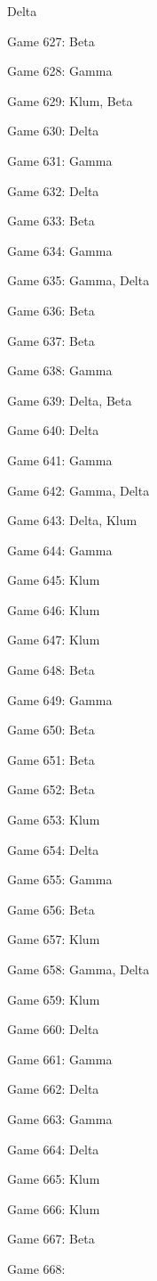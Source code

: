 \documentclass{article}
\begin{document}
\begin{multicols}{3}
\begin{compactitem}
Delta
\item Game 627:
Beta
\item Game 628:
Gamma
\item Game 629:
Klum, Beta
\item Game 630:
Delta
\item Game 631:
Gamma
\item Game 632:
Delta
\item Game 633:
Beta
\item Game 634:
Gamma
\item Game 635:
Gamma, Delta
\item Game 636:
Beta
\item Game 637:
Beta
\item Game 638:
Gamma
\item Game 639:
Delta, Beta
\item Game 640:
Delta
\item Game 641:
Gamma
\item Game 642:
Gamma, Delta
\item Game 643:
Delta, Klum
\item Game 644:
Gamma
\item Game 645:
Klum
\item Game 646:
Klum
\item Game 647:
Klum
\item Game 648:
Beta
\item Game 649:
Gamma
\item Game 650:
Beta
\item Game 651:
Beta
\item Game 652:
Beta
\item Game 653:
Klum
\item Game 654:
Delta
\item Game 655:
Gamma
\item Game 656:
Beta
\item Game 657:
Klum
\item Game 658:
Gamma, Delta
\item Game 659:
Klum
\item Game 660:
Delta
\item Game 661:
Gamma
\item Game 662:
Delta
\item Game 663:
Gamma
\item Game 664:
Delta
\item Game 665:
Klum
\item Game 666:
Klum
\item Game 667:
Beta
\item Game 668:

\end{compactitem}
\end{multicols}
\end{document}
